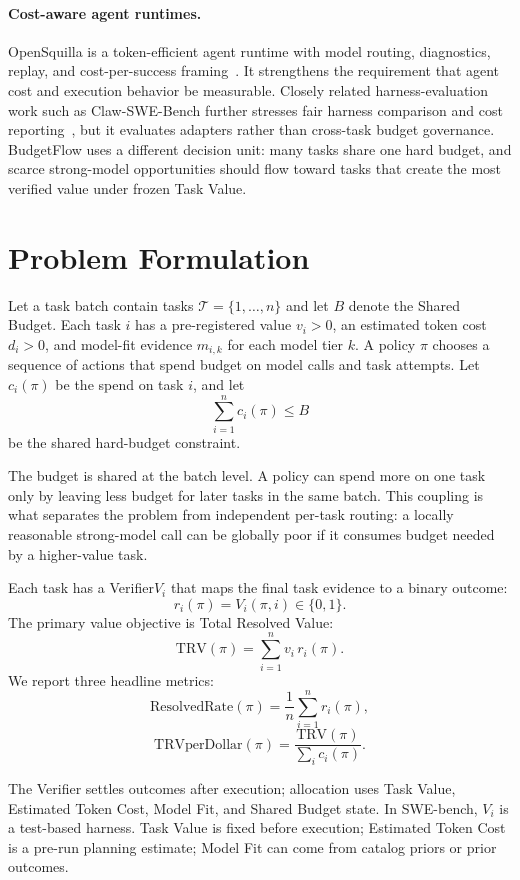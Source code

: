 \documentclass[letterpaper]{article}
\newcommand{\method}{BudgetFlow\xspace}
\newcommand{\taskvalue}{Task Value\xspace}
\newcommand{\tokencost}{Estimated Token Cost\xspace}
\newcommand{\modelfit}{Model Fit\xspace}
\newcommand{\sharedbudget}{Shared Budget\xspace}
\newcommand{\verifier}{Verifier\xspace}
\begin{document}
\paragraph{Cost-aware agent runtimes.}
OpenSquilla is a token-efficient agent runtime with model routing, diagnostics, replay, and cost-per-success framing~\cite{opensquilla}. It strengthens the requirement that agent cost and execution behavior be measurable. Closely related harness-evaluation work such as Claw-SWE-Bench further stresses fair harness comparison and cost reporting~\cite{claw-swe-bench}, but it evaluates adapters rather than cross-task budget governance. \method uses a different decision unit: many tasks share one hard budget, and scarce strong-model opportunities should flow toward tasks that create the most verified value under frozen \taskvalue.

\section{Problem Formulation}
\label{sec:formulation}
Let a task batch contain tasks $\mathcal{T}=\{1,\ldots,n\}$ and let $B$ denote the \sharedbudget. Each task $i$ has a pre-registered value $v_i>0$, an estimated token cost $d_i>0$, and model-fit evidence $m_{i,k}$ for each model tier $k$. A policy $\pi$ chooses a sequence of actions that spend budget on model calls and task attempts. Let $c_i(\pi)$ be the spend on task $i$, and let
\[
    \sum_{i=1}^{n} c_i(\pi) \le B
\]
be the shared hard-budget constraint.

The budget is shared at the batch level. A policy can spend more on one task only by leaving less budget for later tasks in the same batch. This coupling is what separates the problem from independent per-task routing: a locally reasonable strong-model call can be globally poor if it consumes budget needed by a higher-value task.

Each task has a \verifier $V_i$ that maps the final task evidence to a binary outcome:
\[
    r_i(\pi)=V_i(\pi,i)\in\{0,1\}.
\]
The primary value objective is Total Resolved Value:
\[
    \mathrm{TRV}(\pi)=\sum_{i=1}^{n} v_i\,r_i(\pi).
\]
We report three headline metrics:
\[
    \mathrm{ResolvedRate}(\pi)=\frac{1}{n}\sum_{i=1}^{n}r_i(\pi),
\]
\[
    \mathrm{TRVperDollar}(\pi)=
    \frac{\mathrm{TRV}(\pi)}{\sum_i c_i(\pi)}.
\]

The \verifier settles outcomes after execution; allocation uses \taskvalue, \tokencost, \modelfit, and \sharedbudget state. In SWE-bench, $V_i$ is a test-based harness. \taskvalue is fixed before execution; \tokencost is a pre-run planning estimate; \modelfit can come from catalog priors or prior outcomes.
\end{document}
